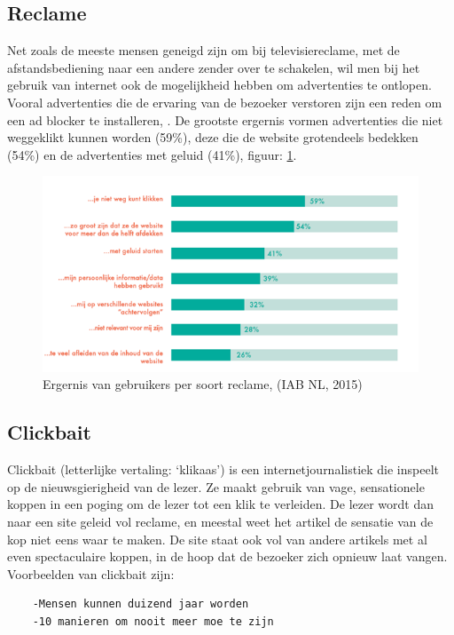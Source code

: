 \documentclass[pdftex,a4paper,12pt,twoside]{report}
\begin{document}
\subsection{Reclame}
\label{sec Reclame}
Net zoals de meeste mensen geneigd zijn om bij televisiereclame, met de afstandsbediening naar een andere zender over te schakelen, wil men bij het gebruik van internet ook de mogelijkheid hebben om advertenties te ontlopen. Vooral advertenties die de ervaring van de bezoeker verstoren zijn een reden om een ad blocker te installeren, \cite{IABNL2015}. De grootste ergernis vormen advertenties die niet weggeklikt kunnen worden (59\%), deze die de website grotendeels bedekken (54\%) en de advertenties met geluid (41\%), figuur: \ref{fig: Redenadblockreclame}.
\begin{figure}[h!]
\centering
\includegraphics[width=12cm]{img/Redenadblockreclame}
\caption{Ergernis van gebruikers per soort reclame, (IAB NL, 2015)}
\label{fig: Redenadblockreclame}
\end{figure}

\subsection{Clickbait}
\label{sec click bait}
Clickbait (letterlijke vertaling: ‘klikaas’) is een internetjournalistiek die inspeelt op de nieuwsgierigheid van de lezer. Ze maakt gebruik van vage, sensationele koppen in een poging om de lezer tot een klik te verleiden. De lezer wordt dan naar een site geleid vol reclame, en meestal weet het artikel de sensatie van de kop niet eens waar te maken. De site staat ook vol van andere artikels met al even spectaculaire koppen, in de hoop dat de bezoeker zich opnieuw laat vangen.
\\
Voorbeelden van clickbait zijn:
\lstset{columns=flexible}
\begin{lstlisting}
	-Mensen kunnen duizend jaar worden
	-10 manieren om nooit meer moe te zijn
\end{lstlisting}
\end{document}
